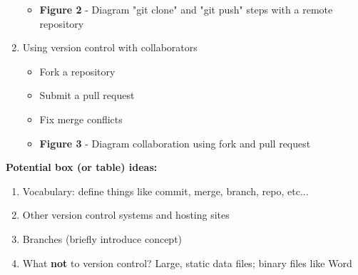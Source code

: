 \begin{enumerate}
\begin{itemize}
    \item \textbf{Figure 2} - Diagram "git clone" and "git push" steps with a remote repository
  \end{itemize}
  \item Using version control with collaborators
    \begin{itemize}
      \item Fork a repository
      \item Submit a pull request
      \item Fix merge conflicts
      \item \textbf{Figure 3} - Diagram collaboration using fork and pull request
  \end{itemize}
\end{enumerate}



\textbf{Potential box (or table) ideas:}
\begin{enumerate}
  \item Vocabulary: define things like commit, merge, branch, repo, etc...
  \item Other version control systems and hosting sites
  \item Branches (briefly introduce concept)
  \item What \textbf{not} to version control? Large, static data files; binary files like Word
\end{enumerate}